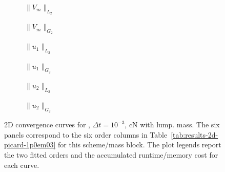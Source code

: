 \begin{figure}[p]
\centering
\begin{subfigure}{0.485\linewidth}
\centering
{}
\caption{$\|V_m\|_{L_2}$}
\label{fig:results-2d-picard-1p0em03-cranknicolson-lumped-a}
\end{subfigure}
\hfill
\begin{subfigure}{0.485\linewidth}
\centering
{}
\caption{$\|V_m\|_{G_2}$}
\label{fig:results-2d-picard-1p0em03-cranknicolson-lumped-b}
\end{subfigure}
\par\vspace{0.8em}
\begin{subfigure}{0.485\linewidth}
\centering
{}
\caption{$\|u_1\|_{L_2}$}
\label{fig:results-2d-picard-1p0em03-cranknicolson-lumped-c}
\end{subfigure}
\hfill
\begin{subfigure}{0.485\linewidth}
\centering
{}
\caption{$\|u_1\|_{G_2}$}
\label{fig:results-2d-picard-1p0em03-cranknicolson-lumped-d}
\end{subfigure}
\par\vspace{0.8em}
\begin{subfigure}{0.485\linewidth}
\centering
{}
\caption{$\|u_2\|_{L_2}$}
\label{fig:results-2d-picard-1p0em03-cranknicolson-lumped-e}
\end{subfigure}
\hfill
\begin{subfigure}{0.485\linewidth}
\centering
{}
\caption{$\|u_2\|_{G_2}$}
\label{fig:results-2d-picard-1p0em03-cranknicolson-lumped-f}
\end{subfigure}
\caption{2D convergence curves for , $\Delta t=10^{-3}$, cN with lump. mass. The six panels correspond to the six order columns in Table~\ref{tab:results-2d-picard-1p0em03} for this scheme/mass block. The plot legends report the two fitted orders and the accumulated runtime/memory cost for each curve.}
\label{fig:results-2d-picard-1p0em03-cranknicolson-lumped}
\end{figure}
\FloatBarrier

